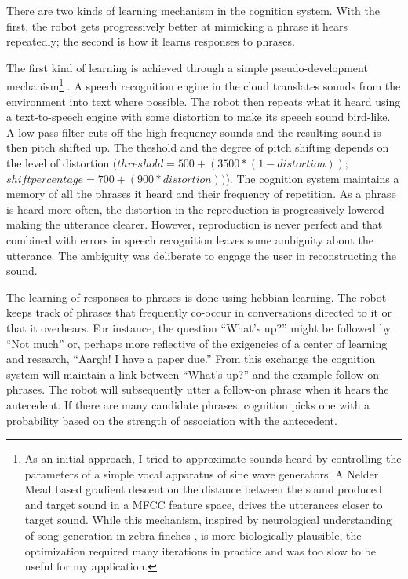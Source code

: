 There are two kinds of learning mechanism in the cognition system. With the first, the robot gets progressively better at mimicking a phrase it hears repeatedly; the second is how it learns responses to phrases. 

The first kind of learning is achieved through a simple pseudo-development mechanism\footnote{As an initial approach, I tried to approximate sounds heard by controlling the parameters of a simple vocal apparatus of sine wave generators. A Nelder Mead based gradient descent on the distance between the sound produced and target sound in a MFCC feature space, drives the utterances closer to target sound. While this mechanism, inspired by neurological understanding of song generation in zebra finches \cite{doya_computational_model_songbird}, is more biologically plausible, the optimization required many iterations in practice and was too slow to be useful for my application.} . A speech recognition engine in the cloud translates sounds from the environment into text where possible. The robot then repeats what it heard using a text-to-speech engine with some distortion to make its speech sound bird-like. A low-pass filter cuts off the high frequency sounds and the resulting sound is then pitch shifted up. The theshold and the degree of pitch shifting depends on the level of distortion ($threshold = 500 + (3500 * (1 - distortion))$; $shift percentage = 700 + (900 * distortion))$). The cognition system maintains a memory of all the phrases it heard and their frequency of repetition. As a phrase is heard more often, the distortion in the reproduction is progressively lowered making the utterance clearer. However, reproduction is never perfect and that combined with errors in speech recognition leaves some ambiguity about the utterance. The ambiguity was deliberate to engage the user in reconstructing the sound. 

The learning of responses to phrases is done using hebbian learning. The robot keeps track of phrases that frequently co-occur in conversations directed to it or that it overhears. For instance, the question ``What's up?'' might be followed by ``Not much'' or, perhaps more reflective of the exigencies of a center of learning and research, ``Aargh! I have a paper due.'' From this exchange the cognition system will maintain a link between ``What's up?'' and the example follow-on phrases. The robot will subsequently utter a follow-on phrase when it hears the antecedent. If there are many candidate phrases, cognition picks one with a probability based on the strength of association with the antecedent. 

